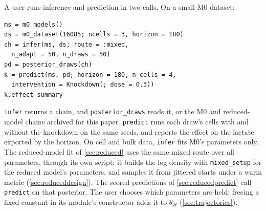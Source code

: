 A user runs inference and prediction in two calls. On a small M0 dataset:
{\footnotesize
\begin{verbatim}
ms = m0_models()
ds = m0_dataset(16085; ncells = 3, horizon = 180)
ch = infer(ms, ds; route = :mixed,
  n_adapt = 50, n_draws = 50)
pd = posterior_draws(ch)
k = predict(ms, pd; horizon = 180, n_cells = 4,
  intervention = Knockdown(; dose = 0.3))
k.effect_summary
\end{verbatim}
}
\noindent \texttt{infer} returns a chain, and \texttt{posterior\_draws} reads it, or the M0 and
reduced-model chains archived for this paper. \texttt{predict} runs each draw's cells with and without the knockdown
on the same seeds, and reports the effect on the lactate exported by the horizon. On cell and bulk data,
\texttt{infer} fits M0's parameters only. The reduced-model fit of \cref{sec:reduced} uses the same mixed route
over all  parameters, through its own script: it builds the log density with
\texttt{mixed\_setup} for the reduced model's parameters, and samples it from jittered starts
under a warm metric (\cref{sec:reduceddesign}). The scored predictions of \cref{sec:reducedpredict} call
\texttt{predict} on that posterior. The user chooses which parameters are held: freeing a fixed
constant in its module's constructor adds it to $\theta_H$ (\cref{sec:trajectories}).
